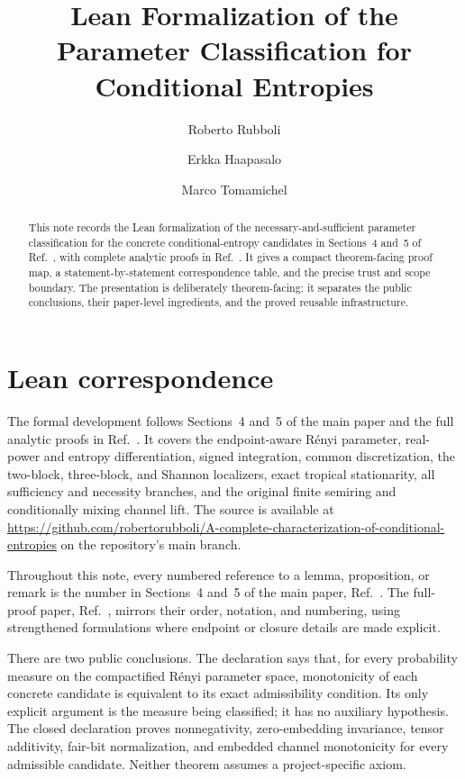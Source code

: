 \documentclass[aps,pra,11pt,onecolumn,nofootinbib,tightenlines]{revtex4-2}
\newcommand{\LeanDecl}[1]{\path{#1}}
\begin{document}
\title{Lean Formalization of the Parameter Classification for Conditional Entropies}

\begin{abstract}
This note records the Lean formalization of the necessary-and-sufficient
parameter classification for the concrete conditional-entropy candidates in
Sections~4 and~5 of Ref.~\cite{rubboli2026complete}, with complete analytic
proofs in Ref.~\cite{rubboli2026parametersFull}. It gives a compact
theorem-facing proof map, a
statement-by-statement correspondence table, and the precise trust and scope
boundary. The presentation is deliberately theorem-facing: it separates the
public conclusions, their paper-level ingredients, and the proved reusable
infrastructure.
\end{abstract}

\author{Roberto Rubboli}
\noaffiliation
\author{Erkka Haapasalo}
\noaffiliation
\author{Marco Tomamichel}
\noaffiliation

\maketitle

\section{Lean correspondence}
\label{sec:lean-correspondence}

The formal development follows Sections~4 and~5 of the main paper and the
full analytic proofs in Ref.~\cite{rubboli2026parametersFull}. It covers the endpoint-aware R\'enyi parameter,
real-power and entropy differentiation, signed integration, common
discretization, the two-block, three-block, and Shannon localizers, exact
tropical stationarity, all sufficiency and necessity branches, and the
original finite semiring and conditionally mixing channel lift. The source is
available at
\url{https://github.com/robertorubboli/A-complete-characterization-of-conditional-entropies}
on the repository's main branch.

Throughout this note, every numbered reference to a lemma, proposition, or
remark is the number in Sections~4 and~5 of the main paper,
Ref.~\cite{rubboli2026complete}. The full-proof paper,
Ref.~\cite{rubboli2026parametersFull}, mirrors their order, notation, and
numbering, using strengthened formulations where endpoint or closure details
are made explicit.

There are two public conclusions. The declaration
\LeanDecl{mainClassification} says that, for every probability measure on the
compactified R\'enyi parameter space, monotonicity of each concrete candidate
is equivalent to its exact admissibility condition. Its only explicit argument
is the measure being classified; it has no auxiliary hypothesis. The closed
declaration \LeanDecl{allConditionalEntropyAxioms} proves nonnegativity,
zero-embedding invariance, tensor additivity, fair-bit normalization, and
embedded channel monotonicity for every admissible candidate. Neither theorem
assumes a project-specific axiom.
\end{document}
